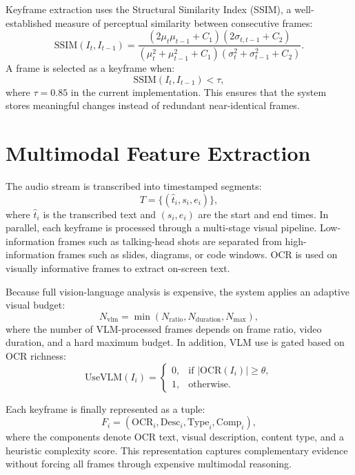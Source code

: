 \documentclass[12pt,a4paper,oneside]{report}
\begin{document}
Keyframe extraction uses the Structural Similarity Index (SSIM), a well-established measure of perceptual similarity between consecutive frames:
\begin{equation}
\text{SSIM}(I_t, I_{t-1}) =
\frac{(2\mu_t \mu_{t-1} + C_1)(2\sigma_{t,t-1} + C_2)}
{(\mu_t^2 + \mu_{t-1}^2 + C_1)(\sigma_t^2 + \sigma_{t-1}^2 + C_2)}.
\end{equation}
A frame is selected as a keyframe when:
\begin{equation}
\text{SSIM}(I_t, I_{t-1}) < \tau,
\end{equation}
where $\tau = 0.85$ in the current implementation. This ensures that the system stores meaningful changes instead of redundant near-identical frames.

\section{Multimodal Feature Extraction}
The audio stream is transcribed into timestamped segments:
\begin{equation}
T = \{(\hat{t}_i, s_i, e_i)\},
\end{equation}
where $\hat{t}_i$ is the transcribed text and $(s_i,e_i)$ are the start and end times. In parallel, each keyframe is processed through a multi-stage visual pipeline. Low-information frames such as talking-head shots are separated from high-information frames such as slides, diagrams, or code windows. OCR is used on visually informative frames to extract on-screen text.

Because full vision-language analysis is expensive, the system applies an adaptive visual budget:
\begin{equation}
N_{\text{vlm}} = \min(N_{\text{ratio}}, N_{\text{duration}}, N_{\max}),
\end{equation}
where the number of VLM-processed frames depends on frame ratio, video duration, and a hard maximum budget. In addition, VLM use is gated based on OCR richness:
\begin{equation}
\text{UseVLM}(I_i)=
\begin{cases}
0, & \text{if } |\text{OCR}(I_i)| \geq \theta, \\
1, & \text{otherwise}.
\end{cases}
\end{equation}

Each keyframe is finally represented as a tuple:
\begin{equation}
F_i = (\text{OCR}_i, \text{Desc}_i, \text{Type}_i, \text{Comp}_i),
\end{equation}
where the components denote OCR text, visual description, content type, and a heuristic complexity score. This representation captures complementary evidence without forcing all frames through expensive multimodal reasoning.
\end{document}
